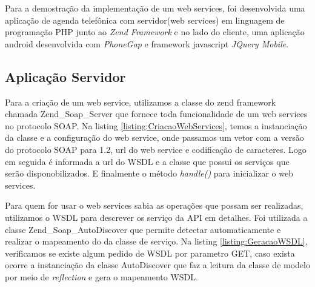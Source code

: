\documentclass{acm_proc_article-sp}
\begin{document}
	
	Para a demostração da implementação de um web services, foi desenvolvida uma aplicação de agenda telefônica com servidor(web services) em linguagem de programação PHP junto ao \emph{Zend Framework} e no lado do cliente, uma aplicação android desenvolvida com \emph{PhoneGap} e framework javascript \emph{JQuery Mobile}.
	
	\subsection{Aplicação Servidor}

	Para a criação de um web service, utilizamos a classe do zend framework chamada Zend\_Soap\_Server que fornece toda funcionalidade de um web services no protocolo SOAP. Na listing \ref{listing:CriacaoWebServices}, temos a instanciação da classe e a configuração do web service, onde passamos um vetor com a versão do protocolo SOAP para 1.2, url do web service e codificação de caracteres. Logo em seguida é informada a url do WSDL e a classe que possui os serviços que serão disponobilizados. E finalmente o método \emph{handle()} para inicializar o web services.
	
	
	
	Para quem for usar o web services sabia as operações que possam ser realizadas, utilizamos o WSDL para descrever os serviço da API em detalhes. Foi utilizada a classe Zend\_Soap\_AutoDiscover que permite detectar automaticamente e realizar o mapeamento do da classe de serviço. Na listing \ref{listing:GeracaoWSDL}, verificamos se existe algum pedido de WSDL por parametro GET, caso exista ocorre a instanciação da classe AutoDiscover que faz a leitura da classe de modelo por meio de \emph{reflection} e gera o mapeamento WSDL.
	
\end{document}
